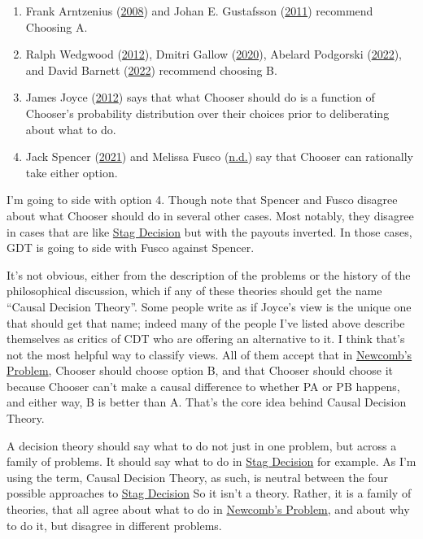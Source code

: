 \documentclass[
  12pt,
  letterpaper,
  DIV=11,
  numbers=noendperiod]{scrreprt}
\providecommand{\tightlist}{%
  \setlength{\itemsep}{0pt}\setlength{\parskip}{0pt}}\usepackage{longtable,booktabs,array}
\begin{document}
\begin{enumerate}
\def\labelenumi{\arabic{enumi}.}
\tightlist
\item
  Frank Arntzenius (\protect\hyperlink{ref-Arntzenius2008}{2008}) and
  Johan E. Gustafsson (\protect\hyperlink{ref-Gustafsson2011}{2011})
  recommend Choosing A.
\item
  Ralph Wedgwood (\protect\hyperlink{ref-Wedgwood2012}{2012}), Dmitri
  Gallow (\protect\hyperlink{ref-Gallow2020}{2020}), Abelard Podgorski
  (\protect\hyperlink{ref-Podgorski2022}{2022}), and David Barnett
  (\protect\hyperlink{ref-Barnett2022}{2022}) recommend choosing B.
\item
  James Joyce (\protect\hyperlink{ref-Joyce2012}{2012}) says that what
  Chooser should do is a function of Chooser's probability distribution
  over their choices prior to deliberating about what to do.
\item
  Jack Spencer (\protect\hyperlink{ref-Spencer2021b}{2021}) and Melissa
  Fusco (\protect\hyperlink{ref-Fuscond}{n.d.}) say that Chooser can
  rationally take either option.
\end{enumerate}

I'm going to side with option 4. Though note that Spencer and Fusco
disagree about what Chooser should do in several other cases. Most
notably, they disagree in cases that are like
\protect\hyperlink{tbl-stag-decision-first}{Stag Decision} but with the
payouts inverted. In those cases, GDT is going to side with Fusco
against Spencer.

It's not obvious, either from the description of the problems or the
history of the philosophical discussion, which if any of these theories
should get the name ``Causal Decision Theory''. Some people write as if
Joyce's view is the unique one that should get that name; indeed many of
the people I've listed above describe themselves as critics of CDT who
are offering an alternative to it. I think that's not the most helpful
way to classify views. All of them accept that in
\protect\hyperlink{tbl-newcomb}{Newcomb's Problem}, Chooser should
choose option B, and that Chooser should choose it because Chooser can't
make a causal difference to whether PA or PB happens, and either way, B
is better than A. That's the core idea behind Causal Decision Theory.

A decision theory should say what to do not just in one problem, but
across a family of problems. It should say what to do in
\protect\hyperlink{tbl-stag-decision-first}{Stag Decision} for example.
As I'm using the term, Causal Decision Theory, as such, is neutral
between the four possible approaches to
\protect\hyperlink{tbl-stag-decision-first}{Stag Decision} So it isn't a
theory. Rather, it is a family of theories, that all agree about what to
do in \protect\hyperlink{tbl-newcomb}{Newcomb's Problem}, and about why
to do it, but disagree in different problems.
\end{document}
